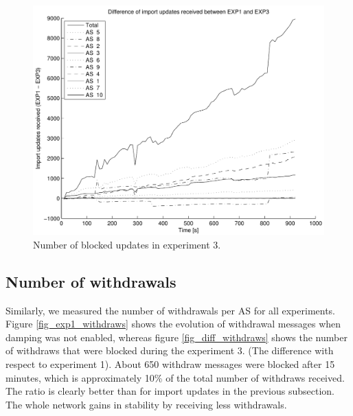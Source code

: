 \documentclass[a4paper,english]{IEEEtran}
\begin{document}
\begin{figure}
\begin{center}
\includegraphics[scale=.5]{img/diff_exp1_exp3_updates.pdf}
\end{center}
\caption{Number of blocked updates in experiment 3.}
\label{fig_diff_updates}
\end{figure}

\subsection{Number of withdrawals}

Similarly, we measured the number of withdrawals per AS for all experiments. 
Figure \ref{fig_exp1_withdraws} shows the evolution of withdrawal messages when damping was not enabled, whereas figure \ref{fig_diff_withdraws}
shows the number of withdraws that were blocked during the experiment 3. (The difference with respect to experiment 1).
About 650 withdraw messages were blocked after 15 minutes, which is approximately 10\% of the total number of withdraws received. The ratio is clearly 
better than for import updates in the previous subsection. The whole network gains in stability by receiving less withdrawals.
\end{document}

